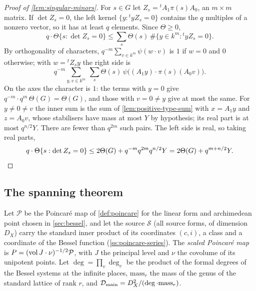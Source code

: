 \begin{proof}[Proof of \cref{lem:singular-minors}]
For $s\in G$ let $Z_s={}^tA_1\pi(s)A_0$, an $m\times m$ matrix. If $\det Z_s=0$, the left kernel $\{y:{}^tyZ_s=0\}$ contains the $q$ multiples of a nonzero vector, so it has at least $q$ elements. Since $\Theta\ge0$,
\[
  q\cdot\Theta\{s:\det Z_s=0\}\le\sum_s\Theta(s)\,\#\{y\in k^m:{}^tyZ_s=0\}.
\]
By orthogonality of characters, $q^{-m}\sum_{v\in k^m}\psi(w\cdot v)$ is $1$ if $w=0$ and $0$ otherwise; with $w={}^tZ_sy$ the right side is
\[
  q^{-m}\sum_{y,v\in k^m}\ \sum_s\Theta(s)\,\psi\bigl((A_1y)\cdot\pi(s)(A_0v)\bigr).
\]
On the axes the character is $1$: the terms with $y=0$ give $q^{-m}\cdot q^m\,\Theta(G)=\Theta(G)$, and those with $v=0\ne y$ give at most the same. For $y\ne0\ne v$ the inner sum is the sum of
\cref{lem:positive-type-sum} with $x=A_1y$ and $z=A_0v$, whose stabilisers have mass at most $Y$ by hypothesis; its real part is at most $q^{n/2}Y$. There are fewer than $q^{2m}$ such pairs. The left side
is real, so taking real parts,
\[
  q\cdot\Theta\{s:\det Z_s=0\}\le2\Theta(G)+q^{-m}q^{2m}q^{n/2}Y=2\Theta(G)+q^{m+n/2}Y.\qedhere
\]
\end{proof}

\subsection{The spanning theorem}\label{ss:spanning-theorem}
Let $\mathcal P$ be the Poincar\'e map of \cref{def:poincare} for the linear form and archimedean point chosen in \cref{sec:bessel}, and let the source $\mathcal S$ (all source
forms, of dimension $D_X$) carry the standard inner product of its coordinates $(c,i)$, a class and a coordinate of the Bessel function (\cref{ss:poincare-series}). The
\emph{scaled Poincar\'e map} is $P=(\operatorname{vol} J\cdot\nu)^{-1/2}\mathcal P$, with $J$ the principal level and $\nu$ the covolume of its unipotent points. Let
$\deg=\prod_v\deg_v$ be the product of the formal degrees of the Bessel systems at the infinite places, $\mathrm{mass}_r$ the mass of the genus of the standard lattice
of rank $r$, and $\mathcal D_{\rm main}=D_X^2/(\deg\cdot\mathrm{mass}_r)$.

